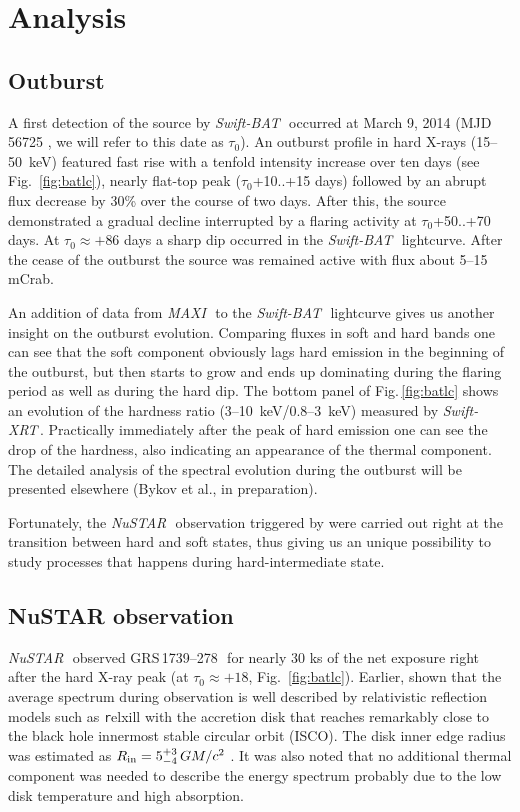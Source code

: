 \documentclass[a4paper,fleqn,usenatbib]{mnras}
\def\grs{{GRS\,1739--278\,}}
\def\swiftx{{\em Swift-XRT\,}}
\def\swiftb{{\em Swift-BAT\,}}
\def\nustar{{\em NuSTAR\,}}
\def\maxi{{\em MAXI\,}}
\begin{document}
\section{Analysis}
\subsection{Outburst}
A first detection of the source by \swiftb\, occurred at March 9, 2014 (MJD 56725 \citep{krimm14_atel}, we will refer to this date as $\tau_{0}$). 
An outburst profile in hard X-rays (15--50~keV) featured fast rise with a tenfold intensity increase over ten days (see Fig.~\ref{fig:batlc}), nearly flat-top peak ($\tau_{0}$+10..+15 days) followed by an abrupt flux decrease by 30\% over the course of two days.
After this, the source demonstrated a gradual decline interrupted by a flaring activity at $\tau_{0}$+50..+70 days. 
At $\tau_{0} \approx +86$ days a sharp dip occurred in the \swiftb\ lightcurve. 
After the cease of the outburst the source was remained active with flux about 5--15 mCrab. 

An addition of data from \maxi\, to the \swiftb\, lightcurve gives us another insight on the outburst evolution. Comparing fluxes in soft and hard bands one can see that the soft component obviously lags hard emission in the beginning of the outburst, but then starts to grow and ends up dominating during the flaring period as well as during the hard dip. 
The bottom panel of Fig.\,\ref{fig:batlc} shows an evolution of the hardness ratio (3--10~keV/0.8--3~keV) measured by \swiftx. 
Practically immediately after the peak of hard emission one can see the drop of the hardness, also indicating an appearance of the thermal component.
The detailed analysis of the spectral evolution during the outburst will be presented elsewhere (Bykov et al., in preparation).

Fortunately, the \nustar\ observation triggered by \cite{miller15_nust} were carried out right at the transition between hard and soft states, thus giving us an unique possibility to study processes that happens during hard-intermediate state. 


\subsection{NuSTAR observation}
\label{sec:nust} 

\nustar\, observed \grs\ for nearly 30 ks of the net exposure right after the hard X-ray peak (at $\tau_{0}\approx+18$, Fig.~\ref{fig:batlc}). 
Earlier, \cite{miller15_nust} shown that the average spectrum during observation is well described by relativistic reflection models such as {\texttt relxill} \citep{garcia14, dauser14,dauser16} with the accretion disk that reaches remarkably close to the black hole innermost stable circular orbit (ISCO). The disk inner edge radius was estimated as $R_{\rm in} = 5^{+3}_{-4}\, G M/c^{2}$ \citep{miller15_nust}. It was also noted that no additional thermal component was needed to describe the energy spectrum probably due to the low disk temperature and high absorption.
\end{document}
